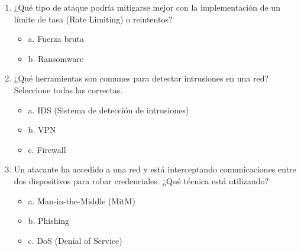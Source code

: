 \documentclass[a4paper]{article}
\begin{document}
\begin{enumerate}
    \item ¿Qué tipo de ataque podría mitigarse mejor con la implementación de un límite de tasa (Rate Limiting) o reintentos? 
    \begin{itemize}
        \item a. Fuerza bruta
        \item b. Ransomware
    \end{itemize}
    
    \item ¿Qué herramientas son comunes para detectar intrusiones en una red? Seleccione todas las correctas.
    \begin{itemize}
        \item a. IDS (Sistema de detección de intrusiones)
        \item b. VPN
        \item c. Firewall
    \end{itemize}
    
    \item Un atacante ha accedido a una red y está interceptando comunicaciones entre dos dispositivos para robar credenciales. ¿Qué técnica está utilizando? %
    \begin{itemize}
        \item a. Man-in-the-Middle (MitM)
        \item b. Phishing
        \item c. DoS (Denial of Service)
    \end{itemize}
    

\end{enumerate}
\end{document}
